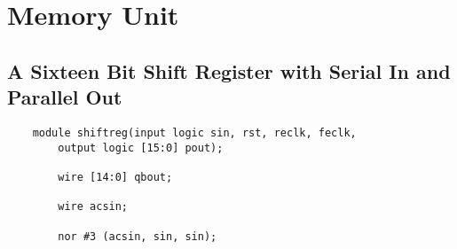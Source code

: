 \documentclass[../main]{subfiles}
\begin{document}
\section{Memory Unit}

\subsection{A Sixteen Bit Shift Register with Serial In and Parallel Out}

\begin{verbatim}
    module shiftreg(input logic sin, rst, reclk, feclk,
        output logic [15:0] pout);

        wire [14:0] qbout;

        wire acsin;

        nor #3 (acsin, sin, sin);


\end{verbatim}
\end{document}
